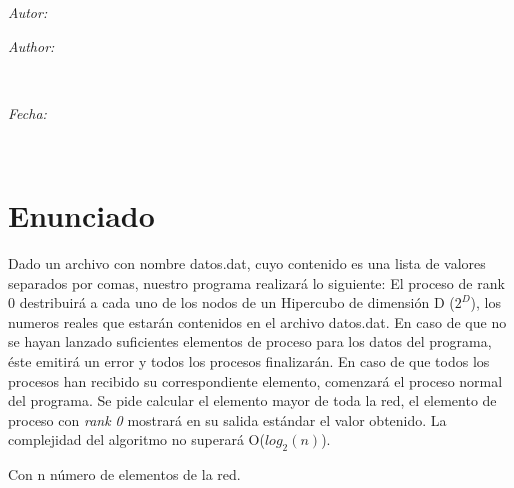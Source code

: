 \documentclass[11pt]{article}
\makeatletter
\newif\ifspanish %
\newif\ifmultipleauthors %
\newcommand{\dateText}{Fecha:}
\newcommand{\dateText}{Date:}
\let\theauthor\@author
\let\thedate\@date
\makeatother
\begin{document}
\begin{titlepage}
	\vspace*{\fill}
	\begin{minipage}{0.4\textwidth}
		\begin{flushleft} \large
			\ifspanish
				\ifmultipleauthors
					\emph{Autores:}\\
				\else
					\emph{Autor:}\\
				\fi
			\else
				\ifmultipleauthors
					\emph{Authors:}\\
				\else
					\emph{Author:}\\
				\fi
			\fi
			\theauthor
			\end{flushleft}
			\end{minipage}~
			\begin{minipage}{0.4\textwidth}
			\begin{flushright} \large
			\emph{\dateText} \\
			\thedate
		\end{flushright}
	\end{minipage}\\[2.25 cm]


\end{titlepage}


\tableofcontents
\pagebreak


\section{Enunciado}
Dado un archivo con nombre datos.dat, cuyo contenido es una lista de valores
separados por comas, nuestro programa realizará lo siguiente:
El proceso de rank 0 destribuirá a cada uno de los nodos de un Hipercubo de
dimensión D (\textbf{$2^{D}$}), los numeros reales que estarán contenidos en el archivo
datos.dat. En caso de que no se hayan lanzado suficientes elementos de proceso
para los datos del programa, éste emitirá un error y todos los procesos
finalizarán.
En caso de que todos los procesos han recibido su correspondiente elemento,
comenzará el proceso normal del programa.
Se pide calcular el elemento mayor de toda la red, el elemento de proceso con
\textit{rank 0} mostrará en su salida estándar el valor obtenido. La complejidad del
algoritmo no superará O($log_2 (n)$).

Con n número de elementos de la red.
\end{document}
